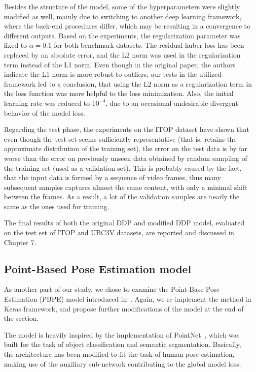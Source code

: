 \noindent Besides the structure of the model, some of the hyperparameters were slightly modified as well, mainly due to switching to another deep learning framework, where the back-end procedures differ, which may be resulting in a convergence to different outputs. Based on the experiments, the regularization parameter was fixed to $\alpha = 0.1$ for both benchmark datasets. The residual huber loss has been replaced by an absolute error, and the L2 norm was used in the regularization term instead of the L1 norm. Even though in the original paper, the authors indicate the L1 norm is more robust to outliers, our tests in the utilized framework led to a conclusion, that using the L2 norm as a regularization term in the loss function was more helpful to the loss minimization. Also, the initial learning rate was reduced to $10^{-4}$, due to an occasional undesirable divergent behavior of the model loss.\par
\vspace{5mm}
\noindent Regarding the test phase, the experiments on the ITOP dataset have shown that even though the test set seems sufficiently representative (that is, retains the approximate distribution of the training set), the error on the test data is by far worse than the error on previously unseen data obtained by random sampling of the training set (used as a validation set). This is probably caused by the fact, that the input data is formed by a sequence of video frames, thus many subsequent samples captures almost the same content, with only a minimal shift between the frames. As a result, a lot of the validation samples are nearly the same as the ones used for training.\par
\vspace{5mm}
\noindent
The final results of both the original DDP and modified DDP model, evaluated on the test set of ITOP and UBC3V datasets, are reported and discussed in Chapter 7.


\subsection{Point-Based Pose Estimation model}

As another part of our study, we chose to examine the Point-Base Pose Estimation (PBPE) model introduced in~\cite{Ali19}. Again, we re-implement the method in Keras framework, and propose further modifications of the model at the end of the section.\par
\vspace{5mm}
\noindent %
The model is heavily inspired by the implementation of PointNet~\cite{DBLP:journals/corr/QiSMG16}, which was built for the task of object classification and semantic segmentation. Basically, the architecture has been modified to fit the task of human pose estimation, making use of the auxiliary sub-network contributing to the global model loss.


